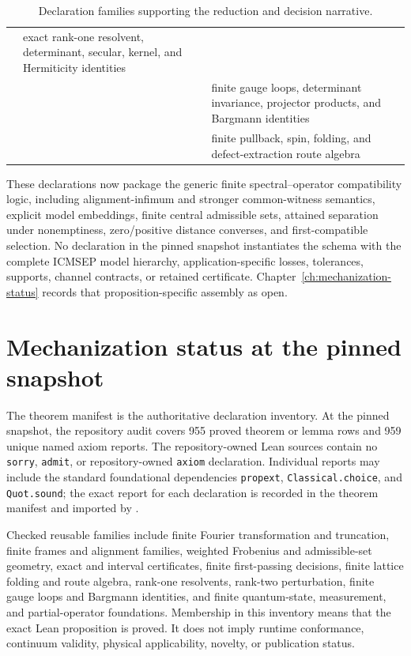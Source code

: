 \begin{table}[ht]
\begin{tabularx}{\textwidth}{@{}Z Y Y@{}}
  & exact rank-one resolvent, determinant, secular, kernel, and Hermiticity identities \\
  & 
  & finite gauge loops, determinant invariance, projector products, and Bargmann
    identities \\
  & 
  & finite pullback, spin, folding, and defect-extraction route algebra \\
\bottomrule
\end{tabularx}
\caption{Declaration families supporting the reduction and decision narrative.}
\label{tab:reduction-decision-implementation-crosswalk}
\end{table}
\FloatBarrier

These declarations now package the generic finite spectral--operator compatibility
logic, including alignment-infimum and stronger common-witness semantics, explicit
model embeddings, finite central admissible sets, attained separation under nonemptiness,
zero/positive distance converses, and first-compatible selection.  No declaration in the
pinned snapshot instantiates the schema with the complete ICMSEP model hierarchy,
application-specific losses, tolerances, supports, channel contracts, or retained
certificate.  Chapter~\ref{ch:mechanization-status} records that proposition-specific
assembly as open.

\section{Mechanization status at the pinned snapshot}

The theorem manifest is the authoritative declaration inventory. At the pinned snapshot,
the repository audit covers 955 proved theorem or lemma rows and 959 unique named axiom
reports. The repository-owned Lean sources contain no \texttt{sorry}, \texttt{admit}, or
repository-owned \texttt{axiom} declaration. Individual reports may include the standard
foundational dependencies \texttt{propext}, \texttt{Classical.choice}, and
\texttt{Quot.sound}; the exact report for each declaration is recorded in the theorem
manifest and imported by .

Checked reusable families include finite Fourier transformation and truncation, finite
frames and alignment families, weighted Frobenius and admissible-set geometry, exact and
interval certificates, finite first-passing decisions, finite lattice folding and route
algebra, rank-one resolvents, rank-two perturbation, finite gauge loops and Bargmann
identities, and finite quantum-state, measurement, and partial-operator foundations.
Membership in this inventory means that the exact Lean proposition is proved. It does
not imply runtime conformance, continuum validity, physical applicability, novelty, or
publication status.
